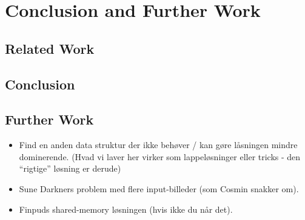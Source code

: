 \chapter{Conclusion and Further Work}

\section{Related Work}

\section{Conclusion}

\section{Further Work}

%
\begin{itemize}
  \item Find en anden data struktur der ikke behøver / kan
    gøre låsningen mindre dominerende. (Hvad vi laver her
    virker som lappeløsninger eller tricks - den ``rigtige''
    løsning er derude)
  \item Sune Darkners problem med flere input-billeder (som Cosmin snakker om).
  \item Finpuds shared-memory løsningen (hvis ikke du når det).
\end{itemize}
%
